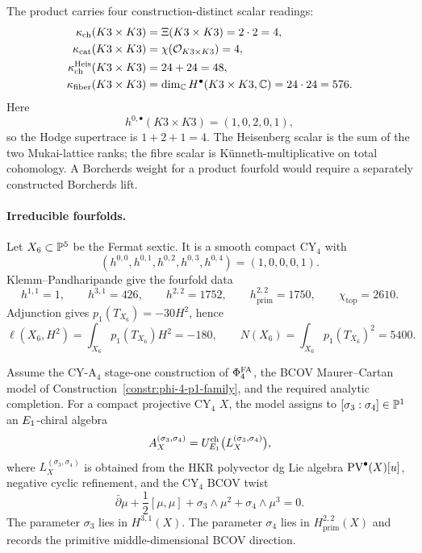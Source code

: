\begin{remark}
\label{rem:cy4-k3-k3-scalars}
The product carries four construction-distinct scalar readings:
\[
\begin{aligned}
  \kappa_{\mathrm{ch}}(K3\times K3)
    &= \Xi(K3\times K3)=2\cdot2=4,\\
  \kappa_{\mathrm{cat}}(K3\times K3)
    &= \chi(\mathcal{O}_{K3\times K3})=4,\\
  \kappa_{\mathrm{ch}}^{\mathrm{Heis}}(K3\times K3)
    &= 24+24=48,\\
  \kappa_{\mathrm{fiber}}(K3\times K3)
    &= \dim_{\mathbb{C}}H^\bullet(K3\times K3,\mathbb{C})=24\cdot24=576.
\end{aligned}
\]
Here
\[
  h^{0,\bullet}(K3\times K3)=(1,0,2,0,1),
\]
so the Hodge supertrace is \(1+2+1=4\). The Heisenberg scalar is
the sum of the two Mukai-lattice ranks; the fibre scalar is
K\"unneth-multiplicative on total cohomology. A Borcherds weight for a
product fourfold would require a separately constructed Borcherds lift.
\end{remark}

\paragraph{Irreducible fourfolds.}
Let \(X_6\subset\mathbb{P}^5\) be the Fermat sextic. It is a smooth compact
CY\(_4\) with
\[
  (h^{0,0},h^{0,1},h^{0,2},h^{0,3},h^{0,4})=(1,0,0,0,1).
\]
Klemm--Pandharipande give the fourfold data
\[
  h^{1,1}=1,\qquad h^{3,1}=426,\qquad h^{2,2}=1752,\qquad
  h^{2,2}_{\mathrm{prim}}=1750,\qquad \chi_{\mathrm{top}}=2610.
\]
Adjunction gives \(p_1(T_{X_6})=-30H^2\), hence
\[
  \ell(X_6,H^2)=\int_{X_6}p_1(T_{X_6})H^2=-180,\qquad
  N(X_6)=\int_{X_6}p_1(T_{X_6})^2=5400.
\]

\begin{construction}
\label{constr:cy4-p1-family-clean}
Assume the CY-A\(_4\) stage-one construction of \(\Phi^{\mathrm{FA}}_4\), the
BCOV Maurer--Cartan model of Construction~\ref{constr:phi-4-p1-family},
and the required analytic completion. For a compact projective CY\(_4\)
\(X\), the model assigns to
\([\sigma_3:\sigma_4]\in\mathbb{P}^1\) an \(E_1\)-chiral algebra
\[
  A_X^{(\sigma_3,\sigma_4)}
  =
  U^{\mathrm{ch}}_{E_1}\bigl(L_X^{(\sigma_3,\sigma_4)}\bigr),
\]
where \(L_X^{(\sigma_3,\sigma_4)}\) is obtained from the HKR polyvector
dg Lie algebra \(\mathrm{PV}^\bullet(X)[u]\), negative cyclic refinement, and
the CY\(_4\) BCOV twist
\[
  \bar\partial\mu+\frac12[\mu,\mu]
  +\sigma_3\wedge\mu^2+\sigma_4\wedge\mu^3=0.
\]
The parameter \(\sigma_3\) lies in \(H^{3,1}(X)\). The parameter
\(\sigma_4\) lies in \(H^{2,2}_{\mathrm{prim}}(X)\) and records the
primitive middle-dimensional BCOV direction.
\end{construction}

